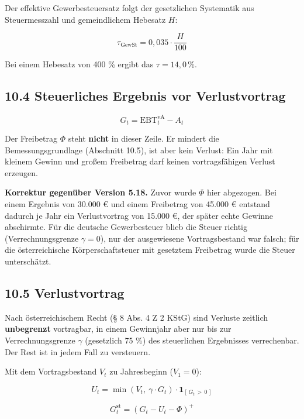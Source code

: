 \documentclass[
  a4paper,
  10pt]{article}
\renewenvironment{quote}
  {\begin{tcolorbox}[
      enhanced,
      breakable,
      colback=Wash,
      colframe=Brand,
      boxrule=0pt,
      leftrule=2.2pt,
      arc=0pt,
      left=8pt,right=8pt,top=6pt,bottom=6pt,
      before skip=8pt,after skip=9pt
    ]\small\color{InkSoft}}
  {\end{tcolorbox}}
\begin{document}
Der effektive Gewerbesteuersatz folgt der gesetzlichen Systematik aus
Steuermesszahl und gemeindlichem Hebesatz \(H\):

\[ \tau_{\mathrm{GewSt}} = 0{,}035 \cdot \frac{H}{100} \]

Bei einem Hebesatz von 400 \% ergibt das \(\tau = 14{,}0\,\%\).

\hypertarget{steuerliches-ergebnis-vor-verlustvortrag}{%
\subsection{10.4 Steuerliches Ergebnis vor
Verlustvortrag}\label{steuerliches-ergebnis-vor-verlustvortrag}}

\[ G_t = \mathrm{EBT}^{\mathrm{vA}}_t - A_t \]

Der Freibetrag \(\Phi\) steht \textbf{nicht} in dieser Zeile. Er mindert
die Bemessungsgrundlage (Abschnitt 10.5), ist aber kein Verlust: Ein
Jahr mit kleinem Gewinn und großem Freibetrag darf keinen
vortragsfähigen Verlust erzeugen.

\begin{quote}
\textbf{Korrektur gegenüber Version 5.18.} Zuvor wurde \(\Phi\) hier
abgezogen. Bei einem Ergebnis von 30.000 € und einem Freibetrag von
45.000 € entstand dadurch je Jahr ein Verlustvortrag von 15.000 €, der
später echte Gewinne abschirmte. Für die deutsche Gewerbesteuer blieb
die Steuer richtig (Verrechnungsgrenze \(\gamma = 0\)), nur der
ausgewiesene Vortragsbestand war falsch; für die österreichische
Körperschaftsteuer mit gesetztem Freibetrag wurde die Steuer
unterschätzt.
\end{quote}

\hypertarget{verlustvortrag}{%
\subsection{10.5 Verlustvortrag}\label{verlustvortrag}}

Nach österreichischem Recht (§ 8 Abs. 4 Z 2 KStG) sind Verluste zeitlich
\textbf{unbegrenzt} vortragbar, in einem Gewinnjahr aber nur bis zur
Verrechnungsgrenze \(\gamma\) (gesetzlich 75 \%) des steuerlichen
Ergebnisses verrechenbar. Der Rest ist in jedem Fall zu versteuern.

Mit dem Vortragsbestand \(V_t\) zu Jahresbeginn (\(V_1 = 0\)):

\[ U_t = \min\left(V_t,\ \gamma \cdot G_t\right) \cdot \mathbf{1}_{[\,G_t\, >\, 0\,]} \]

\[ G^{\mathrm{st}}_t = \left(G_t - U_t - \Phi\right)^{+} \]
\end{document}
